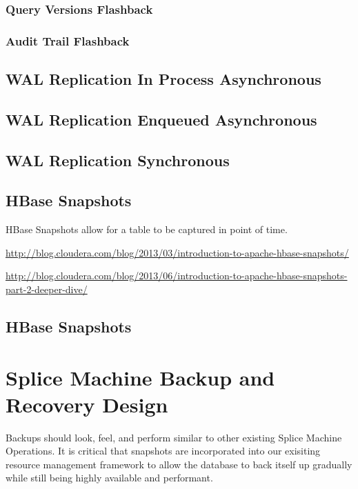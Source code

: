 \subsubsection{Query Versions Flashback}

\subsubsection{Audit Trail Flashback}

\subsection{WAL Replication In Process Asynchronous }

\subsection{WAL Replication Enqueued Asynchronous }

\subsection{WAL Replication Synchronous }

\subsection{HBase Snapshots}

HBase Snapshots allow for a table to be captured in point of time.

\url{http://blog.cloudera.com/blog/2013/03/introduction-to-apache-hbase-snapshots/}

\url{http://blog.cloudera.com/blog/2013/06/introduction-to-apache-hbase-snapshots-part-2-deeper-dive/}

\subsection{HBase Snapshots}

\section{Splice Machine Backup and Recovery Design}

Backups should look, feel, and perform similar to other existing Splice Machine
Operations.  It is critical that snapshots are incorporated into our exisiting
resource management framework to allow the database to back itself up gradually
while still being highly available and performant.

